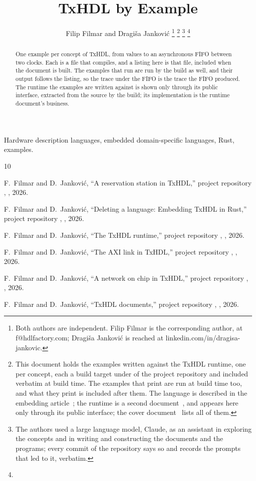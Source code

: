 \documentclass[journal,onecolumn,9pt]{IEEEtran}
\title{TxHDL by Example}
\author{Filip Filmar and Dragiša Janković%
\thanks{Both authors are independent. Filip Filmar is the
corresponding author, at f@hdlfactory.com; Dragiša Janković is
reached at linkedin.com/in/dragisa-jankovic.}%
\thanks{This document holds the examples written against the TxHDL
runtime, one per concept, each a build target under
\code{//lib/examples} of the project repository and included verbatim
at build time. The examples that print are run at build time too, and
what they print is included after them. The language is described in
the embedding article~\cite{embedding}; the runtime is a second
document~\cite{runtime}, and appears here only through its public
interface; the cover document~\cite{cover} lists all of them.}%
\thanks{The authors used a large language model, Claude, as an
assistant in exploring the concepts and in writing and constructing
the documents and the programs; every commit of the repository says
so and records the prompts that led to it, verbatim.}%
\thanks{\buildstamp}}
\begin{document}
\maketitle

\begin{abstract}
One example per concept of TxHDL, from values to an asynchronous FIFO
between two clocks. Each is a file that compiles, and a listing here is
that file, included when the document is built. The examples that run
are run by the build as well, and their output follows the listing, so
the trace under the FIFO is the trace the FIFO produced. The runtime
the examples are written against is shown only through its public
interface, extracted from the source by the build; its implementation
is the runtime document's business.
\end{abstract}

\begin{IEEEkeywords}
Hardware description languages, embedded domain-specific languages, Rust,
examples.
\end{IEEEkeywords}

{\footnotesize\tableofcontents}



\begin{thebibliography}{10}

F.~Filmar and D.~Janković, ``A reservation station in TxHDL,''
project repository , , 2026.

F.~Filmar and D.~Janković, ``Deleting a language: Embedding TxHDL in
Rust,'' project repository , ,
2026.

F.~Filmar and D.~Janković, ``The TxHDL runtime,'' project repository
, , 2026.

F.~Filmar and D.~Janković, ``The AXI link in TxHDL,'' project
repository , , 2026.

F.~Filmar and D.~Janković, ``A network on chip in TxHDL,'' project
repository , , 2026.

F.~Filmar and D.~Janković, ``TxHDL documents,'' project repository
, , 2026.

\end{thebibliography}
\end{document}
